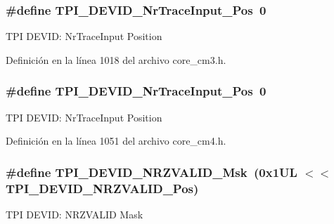 \subsubsection[{\texorpdfstring{T\+P\+I\+\_\+\+D\+E\+V\+I\+D\+\_\+\+Nr\+Trace\+Input\+\_\+\+Pos}{TPI_DEVID_NrTraceInput_Pos}}]{\setlength{\rightskip}{0pt plus 5cm}\#define T\+P\+I\+\_\+\+D\+E\+V\+I\+D\+\_\+\+Nr\+Trace\+Input\+\_\+\+Pos~0}\hypertarget{group___c_m_s_i_s___t_p_i_ga80ecae7fec479e80e583f545996868ed}{}\label{group___c_m_s_i_s___t_p_i_ga80ecae7fec479e80e583f545996868ed}
T\+PI D\+E\+V\+ID\+: Nr\+Trace\+Input Position 

Definición en la línea 1018 del archivo core\+\_\+cm3.\+h.

\subsubsection[{\texorpdfstring{T\+P\+I\+\_\+\+D\+E\+V\+I\+D\+\_\+\+Nr\+Trace\+Input\+\_\+\+Pos}{TPI_DEVID_NrTraceInput_Pos}}]{\setlength{\rightskip}{0pt plus 5cm}\#define T\+P\+I\+\_\+\+D\+E\+V\+I\+D\+\_\+\+Nr\+Trace\+Input\+\_\+\+Pos~0}\hypertarget{group___c_m_s_i_s___t_p_i_ga80ecae7fec479e80e583f545996868ed}{}\label{group___c_m_s_i_s___t_p_i_ga80ecae7fec479e80e583f545996868ed}
T\+PI D\+E\+V\+ID\+: Nr\+Trace\+Input Position 

Definición en la línea 1051 del archivo core\+\_\+cm4.\+h.

\subsubsection[{\texorpdfstring{T\+P\+I\+\_\+\+D\+E\+V\+I\+D\+\_\+\+N\+R\+Z\+V\+A\+L\+I\+D\+\_\+\+Msk}{TPI_DEVID_NRZVALID_Msk}}]{\setlength{\rightskip}{0pt plus 5cm}\#define T\+P\+I\+\_\+\+D\+E\+V\+I\+D\+\_\+\+N\+R\+Z\+V\+A\+L\+I\+D\+\_\+\+Msk~(0x1\+U\+L $<$$<$ T\+P\+I\+\_\+\+D\+E\+V\+I\+D\+\_\+\+N\+R\+Z\+V\+A\+L\+I\+D\+\_\+\+Pos)}\hypertarget{group___c_m_s_i_s___t_p_i_gacecc8710a8f6a23a7d1d4f5674daf02a}{}\label{group___c_m_s_i_s___t_p_i_gacecc8710a8f6a23a7d1d4f5674daf02a}
T\+PI D\+E\+V\+ID\+: N\+R\+Z\+V\+A\+L\+ID Mask 

